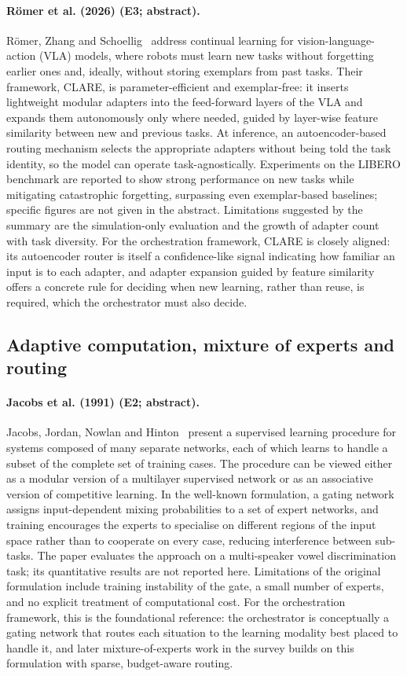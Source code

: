 \documentclass[10pt,a4paper]{article}
\begin{document}
\paragraph{R\"omer et al. (2026) (E3; abstract).} R\"omer, Zhang and Schoellig~\cite{Romer2026b} address continual learning for vision-language-action (VLA) models, where robots must learn new tasks without forgetting earlier ones and, ideally, without storing exemplars from past tasks. Their framework, CLARE, is parameter-efficient and exemplar-free: it inserts lightweight modular adapters into the feed-forward layers of the VLA and expands them autonomously only where needed, guided by layer-wise feature similarity between new and previous tasks. At inference, an autoencoder-based routing mechanism selects the appropriate adapters without being told the task identity, so the model can operate task-agnostically. Experiments on the LIBERO benchmark are reported to show strong performance on new tasks while mitigating catastrophic forgetting, surpassing even exemplar-based baselines; specific figures are not given in the abstract. Limitations suggested by the summary are the simulation-only evaluation and the growth of adapter count with task diversity. For the orchestration framework, CLARE is closely aligned: its autoencoder router is itself a confidence-like signal indicating how familiar an input is to each adapter, and adapter expansion guided by feature similarity offers a concrete rule for deciding when new learning, rather than reuse, is required, which the orchestrator must also decide.

\subsection*{Adaptive computation, mixture of experts and routing}
\paragraph{Jacobs et al. (1991) (E2; abstract).} Jacobs, Jordan, Nowlan and Hinton~\cite{Jacobs1991} present a supervised learning procedure for systems composed of many separate networks, each of which learns to handle a subset of the complete set of training cases. The procedure can be viewed either as a modular version of a multilayer supervised network or as an associative version of competitive learning. In the well-known formulation, a gating network assigns input-dependent mixing probabilities to a set of expert networks, and training encourages the experts to specialise on different regions of the input space rather than to cooperate on every case, reducing interference between sub-tasks. The paper evaluates the approach on a multi-speaker vowel discrimination task; its quantitative results are not reported here. Limitations of the original formulation include training instability of the gate, a small number of experts, and no explicit treatment of computational cost. For the orchestration framework, this is the foundational reference: the orchestrator is conceptually a gating network that routes each situation to the learning modality best placed to handle it, and later mixture-of-experts work in the survey builds on this formulation with sparse, budget-aware routing.
\end{document}
